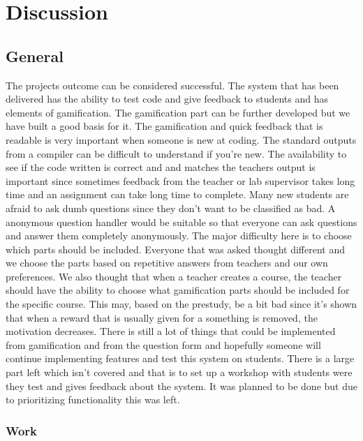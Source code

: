 \chapter{Discussion}
\section{General} 
The projects outcome can be considered successful. The system that has been delivered has the ability to test code and give feedback to students and has elements of gamification. The gamification part can be further developed but we have built a good basis for it. The gamification and quick feedback that is readable is very important when someone is new at coding. The standard outputs from a compiler can be difficult to understand if you're new. The availability to see if the code written is correct and and matches the teachers output is important since sometimes feedback from the teacher or lab supervisor takes long time and an assignment can take long time to complete. Many new students are afraid to ask dumb questions since they don't want to be classified as bad. A anonymous question handler would be suitable so that everyone can ask questions and answer them completely anonymously. The major difficulty here is to choose which parts should be included. Everyone that was asked thought different and we choose the parts based on repetitive answers from teachers and our own preferences. We also thought that when a teacher creates a course, the teacher should have the ability to choose what gamification parts should be included for the specific course. This may, based on the prestudy, be a bit bad since it's shown that when a reward that is usually given for a something is removed, the motivation decreases. There is still a lot of things that could be implemented from gamification and from the question form and hopefully someone will continue implementing features and test this system on students. There is a large part left which isn't covered and that is to set up a workshop with students were they test and gives feedback about the system. It was planned to be done but due to prioritizing functionality this was left.

\subsection{Work}

